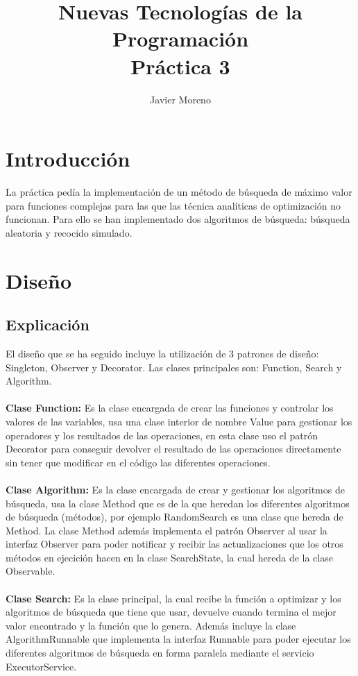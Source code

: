 \documentclass{article}
\title{Nuevas Tecnologías de la Programación \\ Práctica 3}
\author{Javier Moreno}
\theoremstyle{definition}
\theoremstyle{remark}
\begin{document}
\maketitle


\section{Introducción}

La práctica pedía la implementación de un método de búsqueda de máximo valor para funciones complejas para las que las técnica analíticas de optimización no funcionan. Para ello se han implementado dos algoritmos de búsqueda: búsqueda aleatoria y recocido simulado.
\section{Diseño}
\subsection{Explicación}
El diseño que se ha seguido incluye la utilización de 3 patrones de diseño: Singleton, Observer y Decorator. Las clases principales son: Function, Search y Algorithm.\\\\
\textbf{Clase Function:} Es la clase encargada de crear las funciones y controlar los valores de las variables, usa una clase interior de nombre Value para gestionar los operadores y los resultados de las operaciones, en esta clase uso el patrón Decorator para conseguir devolver el resultado de las operaciones directamente sin tener que modificar en el código las diferentes operaciones.\\\\
\textbf{Clase Algorithm:} Es la clase encargada de crear y gestionar los algoritmos de búsqueda, usa la clase Method que es de la que heredan los diferentes algoritmos de búsqueda (métodos), por ejemplo RandomSearch es una clase que hereda de Method. La clase Method además implementa el patrón Observer al usar la interfaz Observer para poder notificar y recibir las actualizaciones que los otros métodos en ejecición hacen en la clase SearchState, la cual hereda de la clase Observable.\\\\
\textbf{Clase Search:} Es la clase principal, la cual recibe la función a optimizar y los algoritmos de búsqueda que tiene que usar, devuelve cuando termina el mejor valor encontrado y la función que lo genera. Además incluye la clase AlgorithmRunnable que implementa la interfaz Runnable para poder ejecutar los diferentes algoritmos de búsqueda en forma paralela mediante el servicio ExecutorService.
\end{document}
